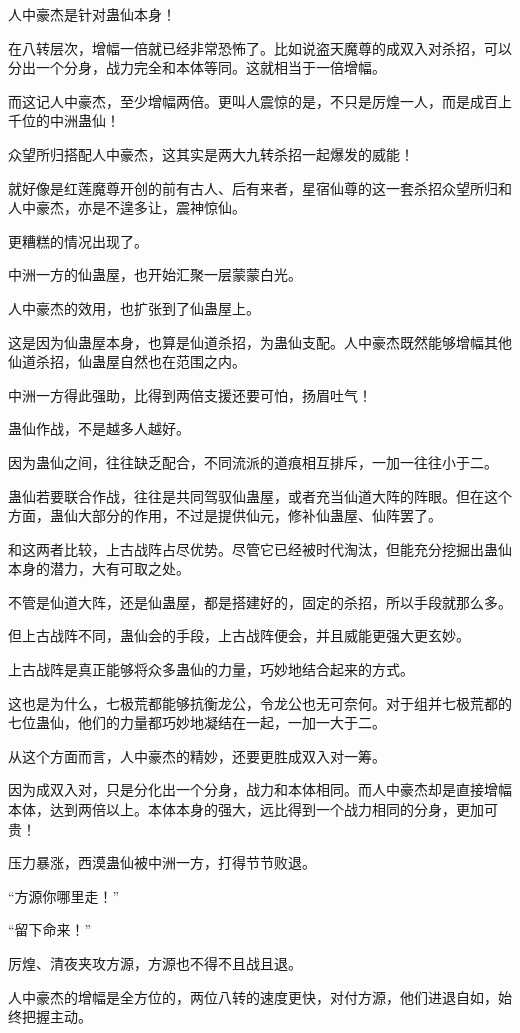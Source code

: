 \begin{this_body}
人中豪杰是针对蛊仙本身！

在八转层次，增幅一倍就已经非常恐怖了。比如说盗天魔尊的成双入对杀招，可以分出一个分身，战力完全和本体等同。这就相当于一倍增幅。

而这记人中豪杰，至少增幅两倍。更叫人震惊的是，不只是厉煌一人，而是成百上千位的中洲蛊仙！

众望所归搭配人中豪杰，这其实是两大九转杀招一起爆发的威能！

就好像是红莲魔尊开创的前有古人、后有来者，星宿仙尊的这一套杀招众望所归和人中豪杰，亦是不遑多让，震神惊仙。

更糟糕的情况出现了。

中洲一方的仙蛊屋，也开始汇聚一层蒙蒙白光。

人中豪杰的效用，也扩张到了仙蛊屋上。

这是因为仙蛊屋本身，也算是仙道杀招，为蛊仙支配。人中豪杰既然能够增幅其他仙道杀招，仙蛊屋自然也在范围之内。

中洲一方得此强助，比得到两倍支援还要可怕，扬眉吐气！

蛊仙作战，不是越多人越好。

因为蛊仙之间，往往缺乏配合，不同流派的道痕相互排斥，一加一往往小于二。

蛊仙若要联合作战，往往是共同驾驭仙蛊屋，或者充当仙道大阵的阵眼。但在这个方面，蛊仙大部分的作用，不过是提供仙元，修补仙蛊屋、仙阵罢了。

和这两者比较，上古战阵占尽优势。尽管它已经被时代淘汰，但能充分挖掘出蛊仙本身的潜力，大有可取之处。

不管是仙道大阵，还是仙蛊屋，都是搭建好的，固定的杀招，所以手段就那么多。

但上古战阵不同，蛊仙会的手段，上古战阵便会，并且威能更强大更玄妙。

上古战阵是真正能够将众多蛊仙的力量，巧妙地结合起来的方式。

这也是为什么，七极荒都能够抗衡龙公，令龙公也无可奈何。对于组并七极荒都的七位蛊仙，他们的力量都巧妙地凝结在一起，一加一大于二。

从这个方面而言，人中豪杰的精妙，还要更胜成双入对一筹。

因为成双入对，只是分化出一个分身，战力和本体相同。而人中豪杰却是直接增幅本体，达到两倍以上。本体本身的强大，远比得到一个战力相同的分身，更加可贵！

压力暴涨，西漠蛊仙被中洲一方，打得节节败退。

“方源你哪里走！”

“留下命来！”

厉煌、清夜夹攻方源，方源也不得不且战且退。

人中豪杰的增幅是全方位的，两位八转的速度更快，对付方源，他们进退自如，始终把握主动。

\end{this_body}

